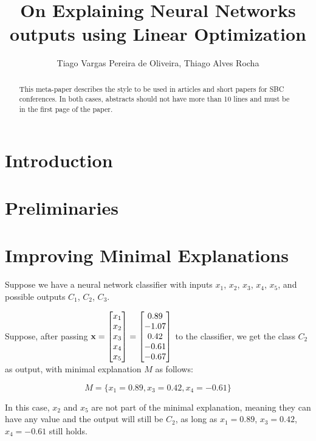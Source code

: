 \documentclass[12pt]{article}
\title{On Explaining Neural Networks outputs using Linear Optimization}
\author{Tiago Vargas Pereira de Oliveira\inst{1}, Thiago Alves Rocha\inst{1}}
\begin{document}
\maketitle

\begin{abstract}
	This meta-paper describes the style to be used in articles and short papers for SBC conferences. In both cases, abstracts should not have more than 10 lines and must be in the first page of the paper.
\end{abstract}

\section{Introduction}

\section{Preliminaries}

\section{Improving Minimal Explanations}



Suppose we have a neural network classifier with inputs $x_1$, $x_2$, $x_3$, $x_4$, $x_5$, and possible outputs $C_1$, $C_2$, $C_3$.

Suppose, after passing $\vb{x} = \begin{bmatrix} x_1 \\ x_2 \\ x_3 \\ x_4 \\ x_5 \end{bmatrix} = \begin{bmatrix} 0.89 \\ -1.07 \\ 0.42 \\ -0.61 \\ -0.67 \end{bmatrix}$ to the classifier, we get the class $C_2$ as output, with minimal explanation $M$ as follows:

\[
M = \{x_1 = 0.89, x_3 = 0.42, x_4 = -0.61\}
\]

In this case, $x_2$ and $x_5$ are not part of the minimal explanation, meaning they can have any value and the output will still be $C_2$, as long as $x_1 = 0.89$, $x_3 = 0.42$, $x_4 = -0.61$ still holds.
\end{document}
